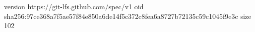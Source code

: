 version https://git-lfs.github.com/spec/v1
oid sha256:97ce368a7f5ae57f84e850a6de14f5c372c8fea6a8727b72135c59c1045f9e3c
size 102
